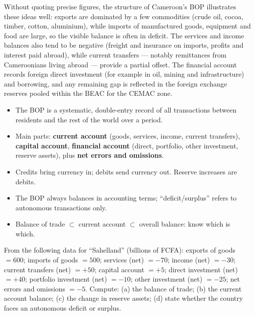 \documentclass[11pt]{article}
\begin{document}
\begin{exemplebox}
Without quoting precise figures, the structure of Cameroon's BOP illustrates these ideas well: exports are dominated by a few commodities (crude oil, cocoa, timber, cotton, aluminium), while imports of manufactured goods, equipment and food are large, so the visible balance is often in deficit. The services and income balances also tend to be negative (freight and insurance on imports, profits and interest paid abroad), while current transfers — notably remittances from Cameroonians living abroad — provide a partial offset. The financial account records foreign direct investment (for example in oil, mining and infrastructure) and borrowing, and any remaining gap is reflected in the foreign exchange reserves pooled within the BEAC for the CEMAC zone.
\end{exemplebox}

\begin{aretenir}
\begin{itemize}
\item The BOP is a systematic, double-entry record of all transactions between residents and the rest of the world over a period.
\item Main parts: \textbf{current account} (goods, services, income, current transfers), \textbf{capital account}, \textbf{financial account} (direct, portfolio, other investment, reserve assets), plus \textbf{net errors and omissions}.
\item Credits bring currency in; debits send currency out. Reserve increases are debits.
\item The BOP always balances in accounting terms; ``deficit/surplus'' refers to autonomous transactions only.
\item Balance of trade $\subset$ current account $\subset$ overall balance: know which is which.
\end{itemize}
\end{aretenir}

\begin{exercice}
From the following data for ``Sahelland'' (billions of FCFA): exports of goods $= 600$; imports of goods $= 500$; services (net) $= -70$; income (net) $= -30$; current transfers (net) $= +50$; capital account $= +5$; direct investment (net) $= +40$; portfolio investment (net) $= -10$; other investment (net) $= -25$; net errors and omissions $= -5$. Compute: (a) the balance of trade; (b) the current account balance; (c) the change in reserve assets; (d) state whether the country faces an autonomous deficit or surplus.
\end{exercice}
\end{document}
